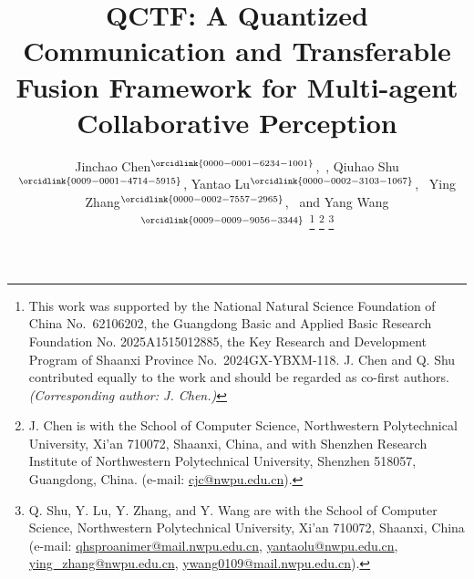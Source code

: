 \documentclass[lettersize,journal]{IEEEtran}
\providecommand{\DIFaddbegin}{} %
\providecommand{\DIFaddend}{} %
\providecommand{\DIFdelbegin}{} %
\providecommand{\DIFdelend}{} %
\newcommand{\DIFscaledelfig}{0.5}
\newlength{\DIFdelgraphicswidth} %
\newlength{\DIFdelgraphicsheight} %
\newcommand{\DIFaddincludegraphics}[2][]{{\color{blue}\fbox{\DIFOincludegraphics[#1]{#2}}}} %
\newcommand{\DIFdelincludegraphics}[2][]{%
\sbox{\DIFdelgraphicsbox}{\DIFOincludegraphics[#1]{#2}}%
\settoboxwidth{\DIFdelgraphicswidth}{\DIFdelgraphicsbox} %
\settoboxtotalheight{\DIFdelgraphicsheight}{\DIFdelgraphicsbox} %
\scalebox{\DIFscaledelfig}{%
\parbox[b]{\DIFdelgraphicswidth}{\usebox{\DIFdelgraphicsbox}\\[-\baselineskip] \rule{\DIFdelgraphicswidth}{0em}}\llap{\resizebox{\DIFdelgraphicswidth}{\DIFdelgraphicsheight}{%
\setlength{\unitlength}{\DIFdelgraphicswidth}%
\begin{picture}(1,1)%
\thicklines\linethickness{2pt} %
{\color[rgb]{1,0,0}\put(0,0){\framebox(1,1){}}}%
{\color[rgb]{1,0,0}\put(0,0){\line( 1,1){1}}}%
{\color[rgb]{1,0,0}\put(0,1){\line(1,-1){1}}}%
\end{picture}%
}\hspace*{3pt}}} %
} %
\DeclareRobustCommand{\DIFaddbegin}{\DIFOaddbegin \let\includegraphics\DIFaddincludegraphics} %
\DeclareRobustCommand{\DIFaddend}{\DIFOaddend \let\includegraphics\DIFOincludegraphics} %
\DeclareRobustCommand{\DIFdelbegin}{\DIFOdelbegin \let\includegraphics\DIFdelincludegraphics} %
\DeclareRobustCommand{\DIFdelend}{\DIFOaddend \let\includegraphics\DIFOincludegraphics} %
\begin{document}
\title{QCTF: A Quantized Communication and Transferable Fusion Framework for Multi-agent Collaborative Perception}
\author{Jinchao Chen$^{\orcidlink{0000-0001-6234-1001}}$,~,
Qiuhao Shu$^{\orcidlink{0009-0001-4714-5915}}$, 
Yantao Lu$^{\orcidlink{0000-0002-3103-1067}}$,~ Ying Zhang$^{\orcidlink{0000-0002-7557-2965}}$,~ and Yang Wang$^{\orcidlink{0009-0009-9056-3344}}$
\DIFdelbegin %
\DIFdelend \DIFaddbegin \thanks{This work was supported by the National Natural Science Foundation of China No.~62106202, the Guangdong Basic and Applied Basic Research Foundation No. 2025A1515012885, the Key Research and Development Program of Shaanxi Province No.~2024GX-YBXM-118. J. Chen and Q. Shu contributed equally to the work and should be regarded as co-first authors. \textit{(Corresponding author: J. Chen.)}} \DIFaddend %
\DIFdelbegin %
\DIFdelend \DIFaddbegin \thanks{J. Chen is with the School of Computer Science, Northwestern Polytechnical University, Xi'an 710072, Shaanxi, China, and with Shenzhen Research Institute of Northwestern Polytechnical University, Shenzhen 518057, Guangdong, China. (e-mail: \href{mailto:cjc@nwpu.edu.cn}{cjc@nwpu.edu.cn}).}
\thanks{Q. Shu, Y. Lu, Y. Zhang, and Y. Wang are with the School of Computer Science, Northwestern Polytechnical University, Xi'an 710072, Shaanxi, China (e-mail: \href{mailto:qhsproanimer@mail.nwpu.edu.cn}{qhsproanimer@mail.nwpu.edu.cn}, \href{mailto:yantaolu@nwpu.edu.cn}{yantaolu@nwpu.edu.cn}, \href{mailto:ying\_zhang@nwpu.edu.cn}{ying\_zhang@nwpu.edu.cn}, \href{mailto:ywang0109@mail.nwpu.edu.cn}{ywang0109@mail.nwpu.edu.cn}).}
\DIFaddend }
\maketitle
\DIFaddbegin 
\end{document}
